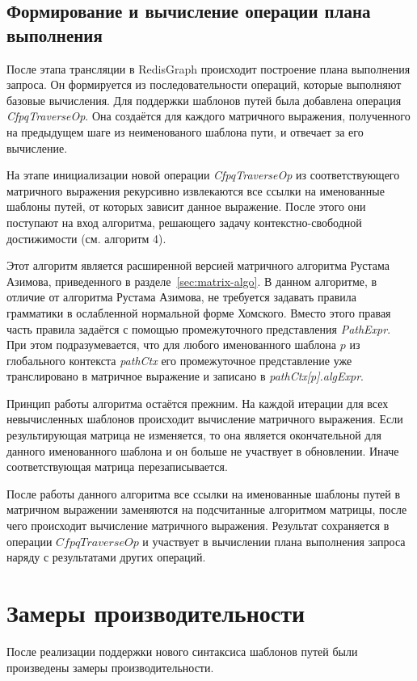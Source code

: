 \subsection{Формирование и вычисление операции плана выполнения}
После этапа трансляции в RedisGraph происходит построение плана выполнения запроса. Он формируется из последовательности операций, которые выполняют базовые вычисления. Для поддержки шаблонов путей была добавлена операция \textit{CfpqTraverseOp}. Она создаётся для каждого матричного выражения, полученного на предыдущем шаге из неименованого шаблона пути, и отвечает за его вычисление.

На этапе инициализации новой операции \textit{CfpqTraverseOp} из соответствующего матричного выражения рекурсивно извлекаются все ссылки на именованные шаблоны путей, от которых зависит данное выражение. После этого они поступают на вход алгоритма, решающего задачу контекстно-свободной достижимости (см. алгоритм 4).

Этот алгоритм является расширенной версией матричного алгоритма Рустама Азимова, приведенного в разделе~\ref{sec:matrix-algo}. В данном алгоритме, в отличие от алгоритма Рустама Азимова, не требуется задавать правила грамматики в ослабленной нормальной форме Хомского. Вместо этого правая часть правила задаётся с помощью промежуточного представления \textit{PathExpr}. При этом подразумевается, что для любого именованного шаблона $p$ из глобального контекста \textit{pathCtx} его промежуточное представление уже транслировано в матричное выражение и записано в \textit{pathCtx[p].algExpr}.

Принцип работы алгоритма остаётся прежним. На каждой итерации для всех невычисленных шаблонов происходит вычисление матричного выражения. Если результирующая матрица не изменяется, то она является окончательной для данного именованного шаблона и он больше не участвует в обновлении. Иначе соответствующая матрица перезаписывается.

После работы данного алгоритма все ссылки на именованные шаблоны путей в матричном выражении заменяются на подсчитанные алгоритмом матрицы, после чего происходит вычисление матричного выражения. Результат сохраняется в операции $CfpqTraverseOp$ и участвует в вычислении плана выполнения запроса наряду с результатами других операций. 


\section{Замеры производительности}
После реализации поддержки нового синтаксиса шаблонов путей были произведены замеры производительности.

